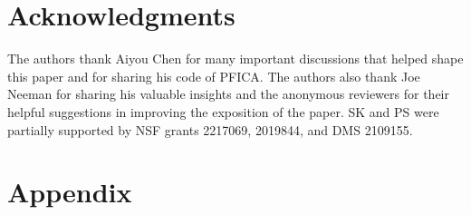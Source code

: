 \documentclass[letterpaper]{article}
\newcommand{\rd}{\color{red}}
\newcommand{\bk}{\color{black}}
\begin{document}
\section*{Acknowledgments}
The authors thank Aiyou Chen for many important discussions that helped shape this paper and for sharing his code of PFICA. The authors also thank Joe Neeman for sharing his valuable insights and the anonymous reviewers for their helpful suggestions in improving the exposition of the paper. SK and PS were partially supported by NSF grants 2217069, 2019844, and DMS 2109155.






\newpage 



\newpage 
\appendix

\section{Appendix}

\renewcommand{\thetheorem}{A.\arabic{theorem}}
\renewcommand{\thesection}{A.\arabic{section}}
\renewcommand{\thefigure}{A.\arabic{figure}}
\renewcommand{\theequation}{A.\arabic{equation}}
\end{document}
